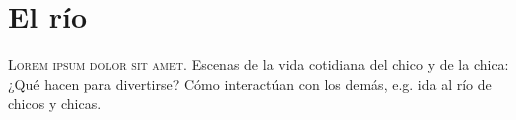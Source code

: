 

\chapter{El río}
\lettrine{L}{orem ipsum dolor sit amet}. Escenas de la vida cotidiana del chico y de la chica: ¿Qué hacen para divertirse? Cómo interactúan con los demás, e.g. ida al río de chicos y chicas.
